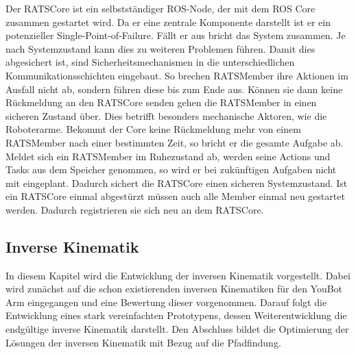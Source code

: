 Der RATSCore ist ein selbstständiger ROS-Node, der mit dem ROS Core zusammen gestartet wird. Da er eine zentrale Komponente darstellt ist er ein potenzieller Single-Point-of-Failure. Fällt er aus bricht das System zusammen. Je nach Systemzustand kann dies zu weiteren Problemen führen. Damit dies abgesichert ist, sind Sicherheitsmechanismen in die unterschiedlichen Kommunikationsschichten eingebaut. So brechen RATSMember ihre Aktionen im Ausfall nicht ab, sondern führen diese bis zum Ende aus. Können sie dann keine Rückmeldung an den RATSCore senden gehen die RATSMember in einen sicheren Zustand über. Dies betrifft besonders mechanische Aktoren, wie die Roboterarme. Bekommt der Core keine Rückmeldung mehr von einem RATSMember nach einer bestimmten Zeit, so bricht er die gesamte Aufgabe ab. Meldet sich ein RATSMember im Ruhezustand ab, werden seine Actions und Tasks aus dem Speicher genommen, so wird er bei zukünftigen Aufgaben nicht mit eingeplant. Dadurch sichert die RATSCore einen sicheren Systemzustand. Ist ein RATSCore einmal abgestürzt müssen auch alle Member einmal neu gestartet werden. Dadurch registrieren sie sich neu an dem RATSCore.

\subsection{Inverse Kinematik}
In diesem Kapitel wird die Entwicklung der inversen Kinematik vorgestellt. Dabei wird zunächst auf die schon existierenden inversen Kinematiken für den YouBot Arm eingegangen und eine Bewertung dieser vorgenommen. Darauf folgt die Entwicklung eines stark vereinfachten Prototypens, dessen Weiterentwicklung die endgültige inverse Kinematik darstellt. Den Abschluss bildet die Optimierung der Lösungen der inversen Kinematik mit Bezug auf die Pfadfindung.

